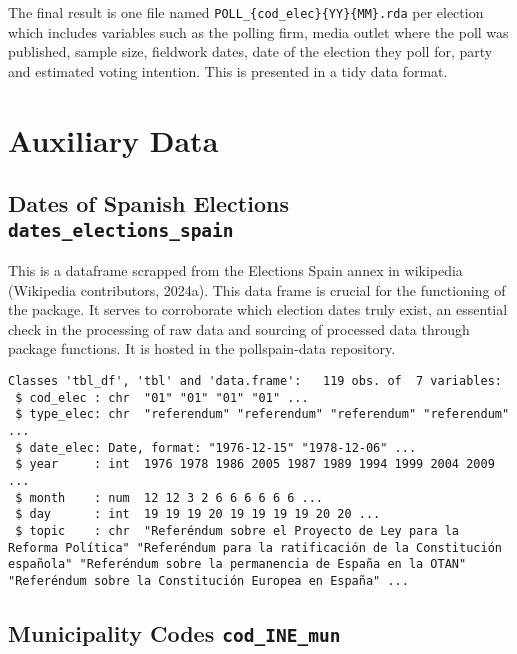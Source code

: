 \documentclass[
  letterpaper,
  DIV=11,
  numbers=noendperiod]{scrreprt}
\begin{document}
The final result is one file named
\texttt{POLL\_\{cod\_elec\}\{YY\}\{MM\}.rda} per election which includes
variables such as the polling firm, media outlet where the poll was
published, sample size, fieldwork dates, date of the election they poll
for, party and estimated voting intention. This is presented in a tidy
data format.

\hypertarget{auxiliary-data}{%
\section{Auxiliary Data}\label{auxiliary-data}}

\hypertarget{dates-of-spanish-elections-dates_elections_spain}{%
\subsection{\texorpdfstring{Dates of Spanish Elections
\texttt{dates\_elections\_spain}}{Dates of Spanish Elections dates\_elections\_spain}}\label{dates-of-spanish-elections-dates_elections_spain}}

This is a dataframe scrapped from the Elections Spain annex in wikipedia
(Wikipedia contributors, 2024a). This data frame is crucial for the
functioning of the package. It serves to corroborate which election
dates truly exist, an essential check in the processing of raw data and
sourcing of processed data through package functions. It is hosted in
the pollspain-data repository.

\begin{verbatim}
Classes 'tbl_df', 'tbl' and 'data.frame':   119 obs. of  7 variables:
 $ cod_elec : chr  "01" "01" "01" "01" ...
 $ type_elec: chr  "referendum" "referendum" "referendum" "referendum" ...
 $ date_elec: Date, format: "1976-12-15" "1978-12-06" ...
 $ year     : int  1976 1978 1986 2005 1987 1989 1994 1999 2004 2009 ...
 $ month    : num  12 12 3 2 6 6 6 6 6 6 ...
 $ day      : int  19 19 19 20 19 19 19 19 20 20 ...
 $ topic    : chr  "Referéndum sobre el Proyecto de Ley para la Reforma Política" "Referéndum para la ratificación de la Constitución española" "Referéndum sobre la permanencia de España en la OTAN" "Referéndum sobre la Constitución Europea en España" ...
\end{verbatim}

\hypertarget{municipality-codes-cod_ine_mun}{%
\subsection{\texorpdfstring{Municipality Codes
\texttt{cod\_INE\_mun}}{Municipality Codes cod\_INE\_mun}}\label{municipality-codes-cod_ine_mun}}
\end{document}

